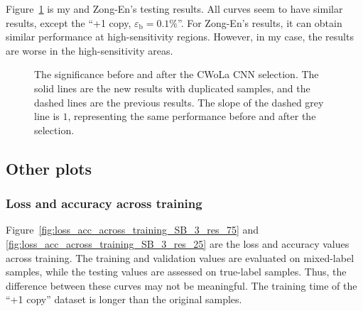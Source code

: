\documentclass[12pt]{article}
\begin{document}
        Figure~\ref{fig:sensitivity_improvement_bkg_eff_copy_1_our_ZN_testing} is my and Zong-En's testing results. All curves seem to have similar results, except the ``+1 copy, $\varepsilon_{\text{b}} = 0.1\%$''. For Zong-En's results, it can obtain similar performance at high-sensitivity regions. However, in my case, the results are worse in the high-sensitivity areas.
        \begin{figure}[htpb]
            \centering
            \caption{The significance before and after the CWoLa CNN selection. The solid lines are the new results with duplicated samples, and the dashed lines are the previous results. The slope of the dashed grey line is $1$, representing the same performance before and after the selection.}
            \label{fig:sensitivity_improvement_bkg_eff_copy_1_our_ZN_testing}
        \end{figure}
    \subsection{Other plots}%
    \label{sub:other_plots}
        \subsubsection{Loss and accuracy across training}%
        \label{subs:loss_and_accuracy_across_training}
            Figure~\ref{fig:loss_acc_across_training_SB_3_res_75} and \ref{fig:loss_acc_across_training_SB_3_res_25} are the loss and accuracy values across training. The training and validation values are evaluated on mixed-label samples, while the testing values are assessed on true-label samples. Thus, the difference between these curves may not be meaningful. The training time of the ``+1 copy'' dataset is longer than the original samples.
\end{document}
